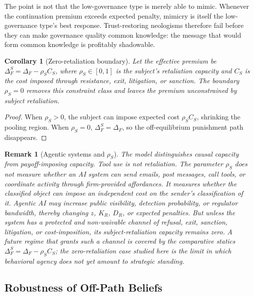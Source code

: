 \documentclass[review,authoryear]{elsarticle}
\newtheorem{corollary}{Corollary}
\newtheorem{remark}{Remark}
\theoremstyle{definition}
\theoremstyle{plain}
\begin{document}
The point is not that the low-governance type is merely able to mimic.  Whenever the continuation premium exceeds expected penalty, mimicry is itself the low-governance type's best response.  Trust-restoring neologisms therefore fail before they can make governance quality common knowledge: the message that would form common knowledge is profitably shadowable.

\begin{corollary}[Zero-retaliation boundary]
\label{cor:retaliation-boundary}
\label{thm:comparative}
Let the effective premium be $\Delta_F^S = \Delta_F - \rho_S C_S$, where $\rho_S \in [0,1]$ is the subject's retaliation capacity and $C_S$ is the cost imposed through resistance, exit, litigation, or sanction.  The boundary $\rho_S=0$ removes this constraint class and leaves the premium unconstrained by subject retaliation.
\end{corollary}
\begin{proof}
When $\rho_S>0$, the subject can impose expected cost $\rho_SC_S$, shrinking the pooling region.  When $\rho_S=0$, $\Delta_F^S=\Delta_F$, so the off-equilibrium punishment path disappears.
\end{proof}

\begin{remark}[Agentic systems and $\rho_S$]
The model distinguishes causal capacity from payoff-imposing capacity. Tool use is not retaliation. The parameter $\rho_S$ does not measure whether an AI system can send emails, post messages, call tools, or coordinate activity through firm-provided affordances. It measures whether the classified object can impose an independent cost on the sender's classification of it. Agentic AI may increase public visibility, detection probability, or regulator bandwidth, thereby changing $z$, $K_R$, $D_R$, or expected penalties. But unless the system has a protected and non-waivable channel of refusal, exit, sanction, litigation, or cost-imposition, its subject-retaliation capacity remains zero. A future regime that grants such a channel is covered by the comparative statics $\Delta_F^S=\Delta_F-\rho_S C_S$; the zero-retaliation case studied here is the limit in which behavioral agency does not yet amount to strategic standing.
\end{remark}

\subsection{Robustness of Off-Path Beliefs}
\label{subsec:robustness}
\end{document}
